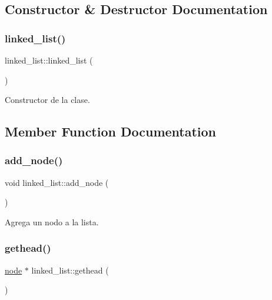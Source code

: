 \subsection{Constructor \& Destructor Documentation}
\mbox{\label{classlinked__list_ad79e40c8889aa821b0ceaa940642683d}} 
\subsubsection{\texorpdfstring{linked\+\_\+list()}{linked\_list()}}
{\footnotesize\ttfamily linked\+\_\+list\+::linked\+\_\+list (\begin{DoxyParamCaption}{ }\end{DoxyParamCaption})}



Constructor de la clase. 



\subsection{Member Function Documentation}
\mbox{\label{classlinked__list_adbd71b912f6ba9dd33b55a3b734cf4d4}} 
\subsubsection{\texorpdfstring{add\+\_\+node()}{add\_node()}}
{\footnotesize\ttfamily void linked\+\_\+list\+::add\+\_\+node (\begin{DoxyParamCaption}{ }\end{DoxyParamCaption})}



Agrega un nodo a la lista. 

\mbox{\label{classlinked__list_a47943b95b9cab032a481e99205ff3b16}} 
\subsubsection{\texorpdfstring{gethead()}{gethead()}}
{\footnotesize\ttfamily \hyperlink{structnode}{node} $\ast$ linked\+\_\+list\+::gethead (\begin{DoxyParamCaption}{ }\end{DoxyParamCaption})}



